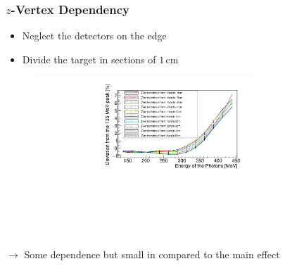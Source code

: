 \documentclass[slidestop,compress,mathserif]{beamer}
\begin{document}
\begin{frame}
	\frametitle{$z$-Vertex Dependency}
	\begin{itemize}

		\item Neglect the detectors on the edge
		\item Divide the target in sections of $1\,\text{cm}$
	\end{itemize}


\begin{figure}
	\includegraphics[width=0.750\textwidth]{Pictures/20172804MCZVertexDeviation}
	
\end{figure}

$\rightarrow$ Some dependence but small in compared to the main effect



\end{frame}
\end{document}
